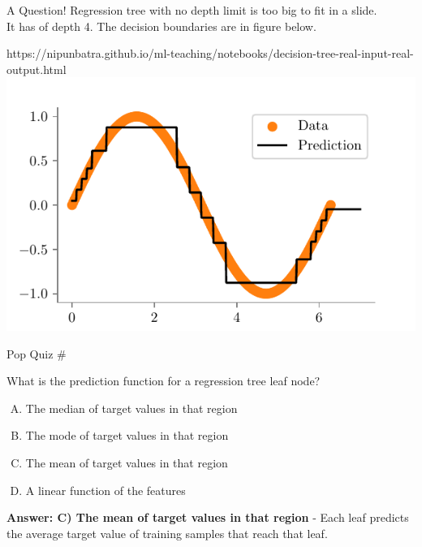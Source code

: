 \documentclass[usenames,dvipsnames]{beamer}
\newcounter{popquiz}
\begin{document}
\begin{frame}{A Question!}
Regression tree with no depth limit is too big to fit in a slide. \\
It has of depth 4. The decision boundaries are in figure below.\\
\begin{center}
	\begin{notebookbox}{https://nipunbatra.github.io/ml-teaching/notebooks/decision-tree-real-input-real-output.html}
		\includegraphics{../assets/decision-trees/figures/sine-depth-4.pdf}
	  \end{notebookbox}
\end{center}
\end{frame}

\begin{frame}{Pop Quiz \#\thepopquiz}
\begin{tcolorbox}[colback=blue!5!white,colframe=blue!75!black,title=Quick Question!]
What is the prediction function for a regression tree leaf node?
\begin{enumerate}[A)]
\item The median of target values in that region
\item The mode of target values in that region  
\item The mean of target values in that region
\item A linear function of the features
\end{enumerate}
\pause
\textbf{Answer: C) The mean of target values in that region} - Each leaf predicts the average target value of training samples that reach that leaf.
\end{tcolorbox}
\end{frame}
\end{document}
